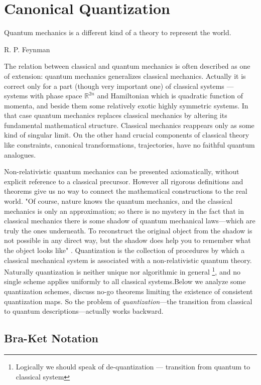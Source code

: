 \chapter{Canonical Quantization}
\label{canonical_quantization}
{
    \setlength{}
\epigraph{ Quantum mechanics is a
different kind of a theory to represent the world.
} {R. P. Feynman}
}
The relation between classical and quantum mechanics is often
described as one of extension: quantum mechanics generalizes
classical mechanics. Actually it is correct only for a
part (though very important one) of classical
 systems ---  systems with phase space $ \mathbb{R}^{2 n} $
 and  Hamiltonian which is quadratic function of momenta,
 and beside them some relatively exotic highly symmetric systems. 
 In that case quantum mechanics
replaces classical mechanics by altering its fundamental
mathematical structure. Classical mechanics reappears only 
as some kind of  singular limit.
On the other hand  crucial components of classical theory 
like constraints, canonical transformations, trajectories,
have no faithful quantum analogues.

Non-relativistic quantum mechanics can be presented axiomatically,
without explicit reference to a classical precursor. 
However all rigorous definitions and theorems give us no way to connect 
the mathematical constructions to the real world. 
"Of course, nature knows the quantum mechanics,
and the classical mechanics is only an approximation; so there is no mystery in
the fact that in classical mechanics there is some shadow of quantum mechanical
laws---which are truly the ones underneath. To reconstruct the original object
from the shadow is not possible in any direct way, but the shadow does help
you to remember what the object looks like" \cite{flp3}. 
Quantization is the collection of procedures by which a classical mechanical 
system is associated with a non-relativistic quantum theory. 
Naturally  quantization is neither unique nor algorithmic in general 
\footnote{ Logically we should speak of de-quantization --- transition from quantum to classical system }, 
and no single scheme applies uniformly to all classical systems.Below  we analyze some quantization schemes, 
discuss no-go theorems limiting the existence of consistent quantization maps.
So the problem of \emph{quantization}---the transition from 
classical to quantum descriptions---actually works backward.

\section{Bra-Ket Notation}
\label{bra-ket-notation}

